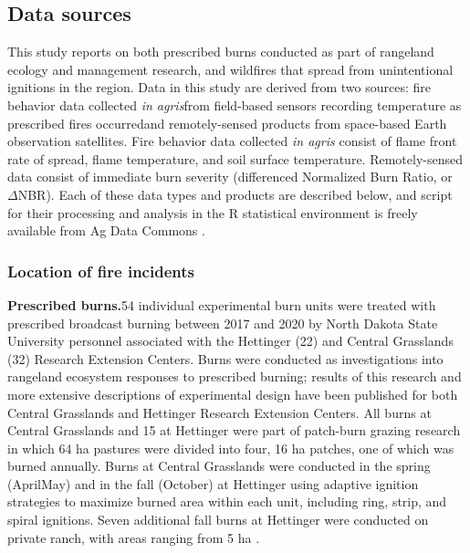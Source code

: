 \documentclass[fire,article,submit,oneauthor,pdftex]{Definitions/mdpi}
\begin{document}
\subsection{Data sources} 

This study reports on both prescribed burns conducted as part of rangeland ecology and management research, and wildfires that spread from unintentional ignitions in the region.
Data in this study are derived from two sources: fire behavior data collected \emph{in agris}\textemdash from field-based sensors recording temperature as prescribed fires occurred\textemdash and remotely-sensed products from space-based Earth observation satellites. 
Fire behavior data collected \emph{in agris} consist of flame front rate of spread, flame temperature, and soil surface temperature. 
Remotely-sensed data consist of immediate burn severity (differenced Normalized Burn Ratio, or $\Delta$NBR). 
Each of these data types and products are described below, and script for their processing and analysis in the \textsf{R} statistical environment \cite{rcoreteam2024} is freely available from Ag Data Commons \cite{mcgranahan2025b}.

\subsubsection{Location of fire incidents}

\textbf{Prescribed burns.\textemdash}54 individual experimental burn units were treated with prescribed broadcast burning between 2017 and 2020 by North Dakota State University personnel associated with the Hettinger (22) and Central Grasslands (32) Research Extension Centers. 
Burns were conducted as investigations into rangeland ecosystem responses to prescribed burning; results of this research and more extensive descriptions of experimental design have been published for both Central Grasslands \cite{duquette2022, wanchuk2024, mcgranahan2025a} and Hettinger \cite{spiess2024, spiess2025} Research Extension Centers. 
All burns at Central Grasslands and 15 at Hettinger were part of patch-burn grazing research in which 64 ha pastures were divided into four, 16 ha patches, one of which was burned annually. 
Burns at Central Grasslands were conducted in the spring (April\textendash May) and in the fall (October) at Hettinger using adaptive ignition strategies to maximize burned area within each unit, including ring, strip, and spiral ignitions. 
Seven additional fall burns at Hettinger were conducted on private ranch, with areas ranging from 5 ha \cite{mcgranahan2022}. 
\end{document}
